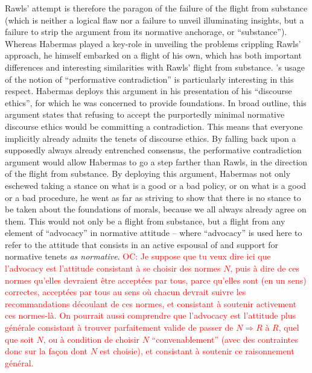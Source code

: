 \documentclass[preprint, french, english, 11pt]{elsarticle}%
\newcommand{\commentOC}[1]{\textcolor{red}{OC: #1}}
\begin{document}
Rawls' attempt is therefore the paragon of the failure of the flight from substance (which is neither a logical flaw nor a failure to unveil illuminating insights, but a failure to strip the argument from its normative anchorage, or ``substance''). Whereas Habermas played a key-role in unveiling the problems crippling Rawls' approach, he himself embarked on a flight of his own, which has both important differences and interesting similarities with Rawls' flight from substance. \cite{habermas_moralbewustsein_1983}'s usage of the notion of ``performative contradiction'' is particularly interesting in this respect. Habermas deploys this argument in his presentation of his ``discourse ethics'', for which he was concerned to provide foundations. In broad outline, this argument states that refusing to accept the purportedly minimal normative discourse ethics would be committing a contradiction. This means that everyone implicitly already admits the tenets of discourse ethics. By falling back upon a supposedly always already entrenched consensus, the performative contradiction argument would allow Habermas to go a step farther than Rawls, in the direction of the flight from substance. By deploying this argument, Habermas not only eschewed taking a stance on what is a good or a bad policy, or on what is a good or a bad procedure, he went as far as striving to show that there is no stance to be taken about the foundations of morals, because we all always already agree on them. This would not only be a flight from substance, but a flight from any element of ``advocacy'' in normative attitude -- where ``advocacy'' is used here to refer to the attitude that consists in an active espousal of and support for normative tenets \emph{as normative}. 
\commentOC{Je suppose que tu veux dire ici que l’advocacy est l’attitude consistant à se choisir des normes $N$, puis à dire de ces normes qu’elles devraient être acceptées par tous, parce qu’elles sont (en un sens) correctes, acceptées par tous au sens où chacun devrait suivre les recommandations découlant de ces normes, et consistant à soutenir activement ces normes-là. On pourrait aussi comprendre que l’advocacy est l’attitude plus générale consistant à trouver parfaitement valide de passer de $N ⇒ R$ à $R$, quel que soit $N$, ou à condition de choisir $N$ “convenablement” (avec des contraintes donc sur la façon dont $N$ est choisie), et consistant à soutenir ce raisonnement général.}
\end{document}
